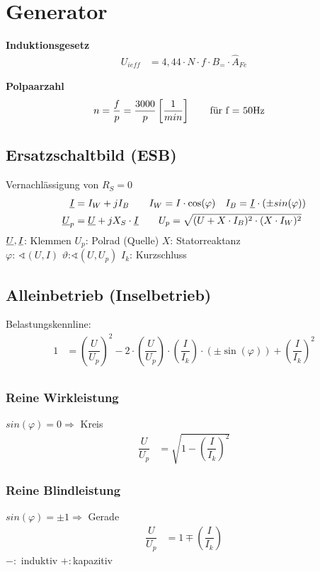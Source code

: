 \clearpage
\section{Generator}
\textbf{Induktionsgesetz}
\begin{align*}
    U_{ieff} &= 4,44 \cdot N \cdot f \cdot B_= \cdot \hat{A}_{Fe}
\end{align*}

\textbf{Polpaarzahl}
\begin{align*}
    n &=\frac{f}{p}= \dfrac{3000}{p} \left[ \frac{1}{min}\right] \qquad \textnormal{für f = 50Hz}
    \end{align*}

\subsection{Ersatzschaltbild (ESB)}
Vernachlässigung von $R_S = 0$
\begin{align*}
    \underline{I} &= I_W +jI_B \qquad I_W = I \cdot \cos(\varphi) \quad I_B = \underline{I}\cdot (\pm sin(\varphi))\\
    \underline{U}_p &= \underline{U} +jX_S \cdot \underline{I} \qquad
    U_p = \sqrt{(U+X\cdot I_B)^2 \cdot (X\cdot I_W)^2}
\end{align*}
$\underline{U}, \underline{I}$: Klemmen \quad $U_p$: Polrad (Quelle) \quad $X$: Statorreaktanz \\
$\varphi$: $\sphericalangle (U, I)$ \qquad $\vartheta$:$\sphericalangle (U, U_p)$ \qquad $I_k$: Kurzschluss




\subsection{Alleinbetrieb (Inselbetrieb)}
Belastungskennline:
\begin{align*}
    1 &= \left( \dfrac{U}{U_p} \right)^2 - 2 \cdot \left( \dfrac{U}{U_p}\right) \cdot \left( \dfrac{I}{I_k}\right) \cdot (\pm \sin(\varphi)) + \left(\dfrac{I}{I_k}\right)^2\\
\end{align*}
\subsubsection{Reine Wirkleistung}
$sin(\varphi) = 0 \Rightarrow$ Kreis
\begin{align*}
    \dfrac{U}{U_p} &= \sqrt{1- \left(\dfrac{I}{I_k}\right)^2}
\end{align*}

\subsubsection{Reine Blindleistung}
$    sin(\varphi) = \pm1 \Rightarrow$ Gerade
\begin{align*}
    \dfrac{U}{U_p} &= 1 \mp \left(\dfrac{I}{I_k}\right)
\end{align*}
$- :$ induktiv \qquad $+ :$kapazitiv

